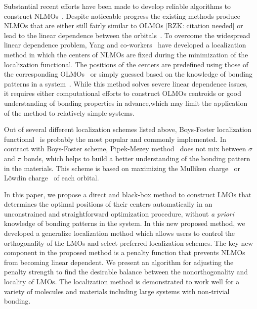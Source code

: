 \documentclass[aps,prl,reprint,amsmath,amssymb]{revtex4-1}
\begin{document}
Substantial recent efforts have been made to develop reliable algorithms to construct NLMOs~\cite{feng2004An_efficient, liu2000nonorthogonal, peng2013effective, hoyvik2017generalising}. %
%
Despite noticeable progress the existing methods produce NLMOs that are either still fairly similar to OLMOs [RZK: citation needed] or lead to the linear dependence between the orbitals~\cite{feng2004An_efficient}. 
To overcome the widespread linear dependence problem, Yang and co-workers~\cite{feng2004An_efficient, cui2010efficient} have developed a localization method in which the centers of NLMOs are fixed during the minimization of the localization functional. 
The positions of the centers are predefined using those of the corresponding OLMOs~\cite{feng2004An_efficient} or simply guessed based on the knowledge of bonding patterns in a system~\cite{cui2010efficient}. %
While this method solves severe linear dependence issues, it requires either computational efforts to construct OLMOs centroids or good understanding of bonding properties in advance,which may limit the application of the method to relatively simple systems.

Out of several different localization schemes listed above, Boys-Foster localization functional~\cite{boys1960construction} is probably the most popular and commonly implemented.
In contract with Boys-Foster scheme, Pipek-Mezey method~\cite{pipek1989a_fast} does not mix between $\sigma$ and $\pi$ bonds, which helps to build a better understanding of the bonding pattern in the materials.
This scheme is based on maximizing the Mulliken charge~\cite{11111} or L{\"o}wdin charge~\cite{2222} of each orbital.

In this paper, we propose a direct and black-box method to construct LMOs that determines the optimal positions of their centers automatically in an unconstrained and straightforward optimization procedure, without \emph{a priori} knowledge of bonding patterns in the system.
In this new proposed method, we developed a generalize localization method which allows users to control the orthogonality of the LMOs and select preferred localization schemes.
The key new component in the proposed method is a penalty function that prevents NLMOs from becoming linear dependent.  
We present an algorithm for adjusting the penalty strength to find the desirable balance between the nonorthogonality and locality of LMOs. 
The localization method is demonstrated to work well for a variety of molecules and materials including large systems with non-trivial bonding. 
\end{document}
